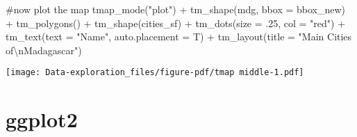 \documentclass[
  letterpaper,
  DIV=11,
  numbers=noendperiod]{scrreprt}
\newenvironment{Shaded}{\begin{snugshade}}{\end{snugshade}}
\newcommand{\AttributeTok}[1]{\textcolor[rgb]{0.40,0.45,0.13}{#1}}
\newcommand{\CommentTok}[1]{\textcolor[rgb]{0.37,0.37,0.37}{#1}}
\newcommand{\DecValTok}[1]{\textcolor[rgb]{0.68,0.00,0.00}{#1}}
\newcommand{\FunctionTok}[1]{\textcolor[rgb]{0.28,0.35,0.67}{#1}}
\newcommand{\NormalTok}[1]{\textcolor[rgb]{0.00,0.23,0.31}{#1}}
\newcommand{\SpecialCharTok}[1]{\textcolor[rgb]{0.37,0.37,0.37}{#1}}
\newcommand{\StringTok}[1]{\textcolor[rgb]{0.13,0.47,0.30}{#1}}
\begin{document}
\begin{Shaded}
\begin{Highlighting}[]
\CommentTok{\#now plot the map}
\FunctionTok{tmap\_mode}\NormalTok{(}\StringTok{"plot"}\NormalTok{) }\SpecialCharTok{+}
  \FunctionTok{tm\_shape}\NormalTok{(mdg, }\AttributeTok{bbox =}\NormalTok{ bbox\_new) }\SpecialCharTok{+}
  \FunctionTok{tm\_polygons}\NormalTok{() }\SpecialCharTok{+}
  \FunctionTok{tm\_shape}\NormalTok{(cities\_sf) }\SpecialCharTok{+}
  \FunctionTok{tm\_dots}\NormalTok{(}\AttributeTok{size =}\NormalTok{ .}\DecValTok{25}\NormalTok{, }\AttributeTok{col =} \StringTok{"red"}\NormalTok{) }\SpecialCharTok{+}
  \FunctionTok{tm\_text}\NormalTok{(}\AttributeTok{text =} \StringTok{"Name"}\NormalTok{, }\AttributeTok{auto.placement =}\NormalTok{ T) }\SpecialCharTok{+}
  \FunctionTok{tm\_layout}\NormalTok{(}\AttributeTok{title =} \StringTok{"Main Cities of}\SpecialCharTok{\textbackslash{}n}\StringTok{Madagascar"}\NormalTok{)}
\end{Highlighting}
\end{Shaded}

\texttt{[image: Data-exploration\_files/figure-pdf/tmap middle-1.pdf]}

\section{ggplot2}
\end{document}
